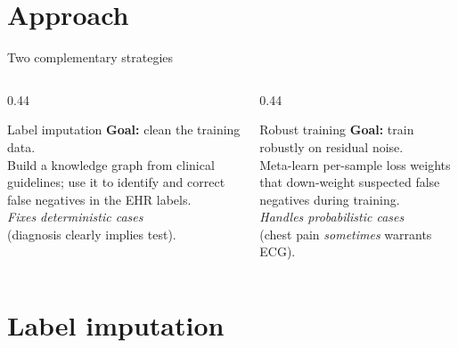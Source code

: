 \documentclass[aspectratio=169]{beamer}
\begin{document}
\section{Approach}

\begin{frame}{Two complementary strategies}
  \centering
  \vspace{0.5em}
  \begin{columns}[c]
    \begin{column}{0.44\textwidth}
      \begin{block}{\centering Label imputation}
        \small
        \textbf{Goal:} clean the training data.\\[0.3em]
        Build a knowledge graph from clinical guidelines;
        use it to identify and correct false negatives
        in the EHR labels.\\[0.3em]
        \textit{Fixes deterministic cases}\\
        (diagnosis clearly implies test).
      \end{block}
    \end{column}
    \begin{column}{0.44\textwidth}
      \begin{block}{\centering Robust training}
        \small
        \textbf{Goal:} train robustly on residual noise.\\[0.3em]
        Meta-learn per-sample loss weights that
        down-weight suspected false negatives
        during training.\\[0.3em]
        \textit{Handles probabilistic cases}\\
        (chest pain \emph{sometimes} warrants ECG).
      \end{block}
    \end{column}
  \end{columns}
\end{frame}

\section{Label imputation}
\end{document}
